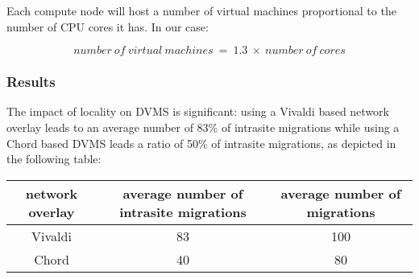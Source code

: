 Each compute node will host a number of virtual machines proportional to the 
number of CPU cores it has. In our case:

\[
	number\ of\ virtual\ machines\ =\ 1.3\ \times\ number\ of\ cores
\]

\subsubsection{Results}

The impact of locality on DVMS is significant: using a Vivaldi based network
overlay leads to an average number of 83\% of intrasite migrations while using 
a Chord based DVMS leads a ratio of 50\% of intrasite migrations, as depicted
in the following table:


\begin{tabular}{|c|c|c|}
  
  \hline
  network overlay & \multicolumn{1}{|p{3cm}|}{\centering average number of intrasite migrations}  & \multicolumn{1}{|p{3cm}|}{ \centering average number of migrations}  \\

  \hline
  Vivaldi & 83 & 100 \\

  \hline
  Chord & 40 & 80 \\

  \hline
\end{tabular}

